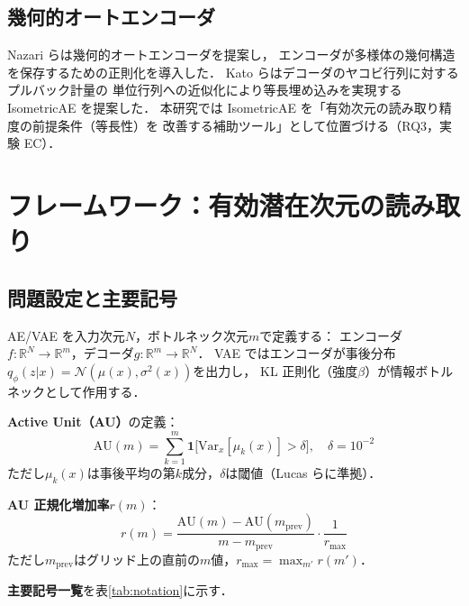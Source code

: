 \documentclass[11pt,a4paper]{jsarticle}
\newcommand{\R}{\mathbb{R}}
\begin{document}
\subsection{幾何的オートエンコーダ}\label{sec:related_geo}

Nazari ら\cite{nazari2023geometric}は幾何的オートエンコーダを提案し，
エンコーダが多様体の幾何構造を保存するための正則化を導入した．
Kato ら\cite{kato2020rdae}はデコーダのヤコビ行列に対するプルバック計量の
単位行列への近似化により等長埋め込みを実現する IsometricAE を提案した．
本研究では IsometricAE を「有効次元の読み取り精度の前提条件（等長性）を
改善する補助ツール」として位置づける（RQ3，実験 EC）．

\section{フレームワーク：有効潜在次元の読み取り}\label{sec:framework}

\subsection{問題設定と主要記号}\label{sec:framework_setup}

AE/VAE を入力次元$N$，ボトルネック次元$m$で定義する：
エンコーダ$f: \R^N \to \R^m$，デコーダ$g: \R^m \to \R^N$．
VAE ではエンコーダが事後分布$q_\phi(z|x) = \mathcal{N}(\mu(x), \sigma^2(x))$を出力し，
KL 正則化（強度$\beta$）が情報ボトルネックとして作用する．

\textbf{Active Unit（AU）}の定義：
\begin{equation}
  \mathrm{AU}(m) = \sum_{k=1}^{m} \mathbf{1}\bigl[\mathrm{Var}_x[\mu_k(x)] > \delta\bigr],
  \quad \delta = 10^{-2}
  \label{eq:au_def}
\end{equation}
ただし$\mu_k(x)$は事後平均の第$k$成分，$\delta$は閾値（Lucas ら\cite{lucas2019elbo}に準拠）．

\textbf{AU 正規化増加率}$r(m)$：
\begin{equation}
  r(m) = \frac{\mathrm{AU}(m) - \mathrm{AU}(m_{\mathrm{prev}})}{m - m_{\mathrm{prev}}} \cdot \frac{1}{r_{\max}}
  \label{eq:au_rate}
\end{equation}
ただし$m_{\mathrm{prev}}$はグリッド上の直前の$m$値，$r_{\max} = \max_{m'} r(m')$．

\textbf{主要記号一覧}を表\ref{tab:notation}に示す．
\end{document}
